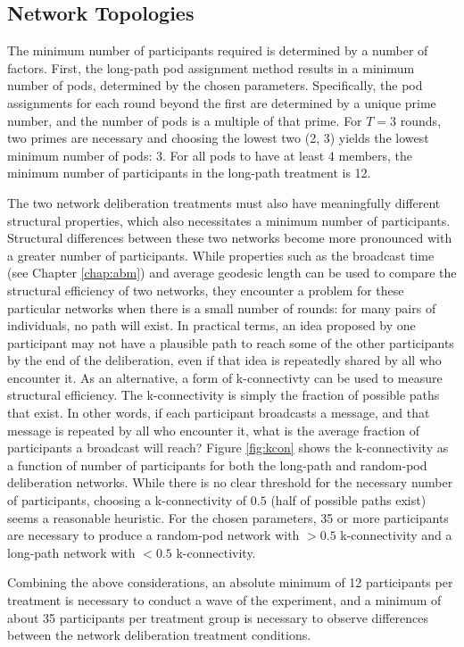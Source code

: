 \subsection{Network Topologies}
The minimum number of participants required is determined by a number of factors.
First, the long-path pod assignment method results in a minimum number of pods,
determined by the chosen parameters.
Specifically, the pod assignments for each round beyond the first are determined
by a unique prime number,
and the number of pods is a multiple of that prime.
For $T=3$ rounds, two primes are necessary and choosing the lowest two (2, 3)
yields the lowest minimum number of pods: 3.
For all pods to have at least 4 members, the minimum number of participants in
the long-path treatment is 12.

The two network deliberation treatments must also have meaningfully different
structural properties,
which also necessitates a minimum number of participants.
Structural differences between these two networks become more pronounced
with a greater number of participants.
While properties such as the broadcast time (see Chapter \ref{chap:abm})
and average geodesic length can be used to compare the structural efficiency of
two networks,
they encounter a problem for these particular networks
when there is a small number of rounds:
for many pairs of individuals, no path will exist.
In practical terms,
an idea proposed by one participant may not have a plausible
path to reach some of the other participants by the end of the deliberation,
even if that idea is repeatedly shared by all who encounter it.
As an alternative, a form of k-connectivty can be used to measure
structural efficiency.
The k-connectivity is simply the fraction of possible paths that exist.
In other words, if each participant broadcasts a message, and that message is
repeated by all who encounter it, what is the average fraction of participants
a broadcast will reach?
Figure \ref{fig:kcon} shows the k-connectivity as a function of number of
participants for both the long-path and random-pod deliberation networks.
While there is no clear threshold for the necessary number of participants,
choosing a k-connectivity of $0.5$ (half of possible paths exist) seems a
reasonable heuristic.
For the chosen parameters, 35 or more participants are necessary to produce
a random-pod network with $>0.5$ k-connectivity and
a long-path network with $<0.5$ k-connectivity.

Combining the above considerations,
an absolute minimum of 12 participants per treatment is necessary to conduct
a wave of the experiment,
and a minimum of about 35 participants per treatment group is necessary to
observe differences between the network deliberation treatment conditions.

